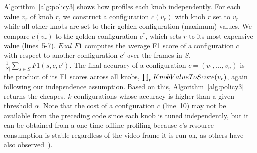 Algorithm~\ref{alg:policy3} shows how \name profiles each knob independently.
For each value $v_r$ of knob $r$, we construct a configuration 
$c(v_r)$ with knob $r$ set to $v_r$ while all other knobs are set to their 
golden configuration (maximum) values. We compare $c(v_r)$ to the golden configuration $c^*$, which sets $r$ to its most expensive value (lines~5-7). 
$Eval\_F1$ computes the average F1 score of a configuration $c$ with respect to
another configuration $c'$ over the frames in $S$, \ie $\frac{1}{|S|}\sum_{s\in S} F1(s,c,c')$. 
The final accuracy of a configuration 
$c=(v_1,\dots,v_n)$ is the product of its F1 scores across all knobs, \ie 
$\prod_{r}KnobValue\sep ToScore(v_r)$, again following our independence assumption. Based on this, Algorithm~\ref{alg:policy3} returns the cheapest
$k$ configurations whose accuracy is higher than a given threshold $\alpha$. 
Note that the cost of a configuration $c$ (line~10) may not be available from the preceding
code since each knob is tuned independently, but it can be obtained from
a one-time offline profiling because $c$'s resource consumption is stable regardless of
the video frame it is run on, as others have also observed~\cite[\S6.2]{noscope}).



